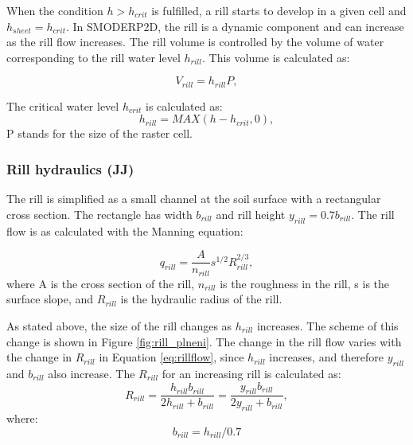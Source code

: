             When the condition $h>h_{crit}$ is fulfilled, a rill starts to develop in a
            given cell and $h_{sheet}=h_{crit}$. In SMODERP2D, the rill is a dynamic component and
            can increase as the rill flow increases. The rill volume is controlled by the
            volume of water corresponding to the rill water level $h_{rill}$. This volume is
            calculated as:


            \begin{equation}
              V_{rill} = h_{rill}P,
              \label{eq:rillvol}
            \end{equation}

            The critical water level $h_{crit}$ is calculated as:
            \begin{equation}
              h_{rill} = MAX(h-h_{crit},0),
              \label{eq:hrill}
            \end{equation}
            P stands for the size of the raster cell. 

        \subsubsection{Rill hydraulics (JJ)}\label{sec:rill}

            The rill is simplified as a small channel at the soil surface with
            a rectangular cross section. The rectangle has width $b_{rill}$ and
            rill height $y_{rill} = 0.7b_{rill}$. The rill flow is as
            calculated with the Manning equation: 

            \begin{equation}
                q_{rill} = \frac{A}{n_{rill}} s^{1/2} R_{rill}^{2/3},
              \label{eq:rillflow}
            \end{equation}
            where A is the cross section of the rill,  $n_{rill}$ is the roughness in the
            rill, s is the surface slope, and  $R_{rill}$  is the hydraulic radius of the
            rill. 

            As stated above, the size of the rill changes as $h_{rill}$ increases. The
            scheme of this change is shown in Figure \ref{fig:rill_plneni}. The change in
            the rill flow varies with the change in $R_{rill}$ in Equation
            \ref{eq:rillflow}, since $h_{rill}$ increases, and therefore $y_{rill}$ and
            $b_{rill}$ also increase. The $R_{rill}$ for an increasing rill is calculated
            as:
            \begin{equation}
                R_{rill} = \frac{h_{rill}b_{rill}}{2h_{rill}+b_{rill}}  =
                \frac{y_{rill}b_{rill}}{2y_{rill}+b_{rill}},
              \label{eq:rrill}
            \end{equation}
            where:
            \begin{equation}
              b_{rill} = h_{rill}/0.7
              \label{eq:brill}
            \end{equation}



